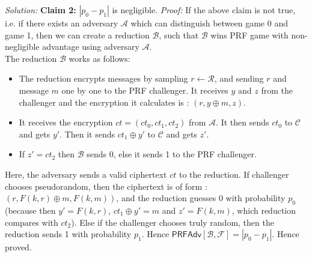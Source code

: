 \documentclass[a4paper, 11pt]{article}
\newenvironment{solution}
    {\textit{Solution:}}
    {\clearpage}
\newcommand{\prf}{\mathsf{PRFAdv}}
\newcommand{\calA}{\mathcal{A}}
\newcommand{\calB}{\mathcal{B}}
\newcommand{\calC}{\mathcal{C}}
\newcommand{\calF}{\mathcal{F}}
\newcommand{\calR}{\mathcal{R}}
\begin{document}
\begin{solution}
\textbf{Claim 2: } $|p_0 - p_1|$ is negligible.
\textit{Proof:} If the above claim is not true, i.e. if there exists an adversary $\calA$ which can distinguish between game 0 and game 1, then we can create a reduction $\calB$, such that $\calB$ wins PRF game with non-negligible advantage using adversary $\calA$. \\
The reduction $\calB$ works as follows:
\begin{itemize}
    \item The reduction encrypts messages by sampling $r \leftarrow \calR$, and sending $r$ and message $m$ one by one to the PRF challenger. It receives $y$ and $z$ from the challenger and the encryption it calculates is : $(r, y \oplus m, z)$.
    \item It receives the encryption $ct = (ct_0, ct_1, ct_2)$ from $\calA$. It then sends $ct_0$ to $\calC$ and gets $y'$. Then it sends $ct_1 \oplus y'$ to $\calC$ and gets $z'$.
    \item  If $z' = ct_2$ then $\calB$ sends 0, else it sends 1 to the PRF challenger.
\end{itemize}
Here, the adversary sends a valid ciphertext $ct$ to the reduction. If challenger chooses pseudorandom, then the ciphertext is of form : $(r, F(k, r) \oplus m, F(k, m))$, and the reduction guesses 0 with probability $p_0$ (because then $y' = F(k, r)$, $ct_1 \oplus y' = m$ and $z' = F(k, m)$, which reduction compares with $ct_2$). Else if the challenger chooses truly random, then the reduction sends 1 with probability $p_1$. Hence $ \prf[\calB, \calF] = | p_0 - p_1 | $. Hence proved.
\end{solution}
\end{document}
